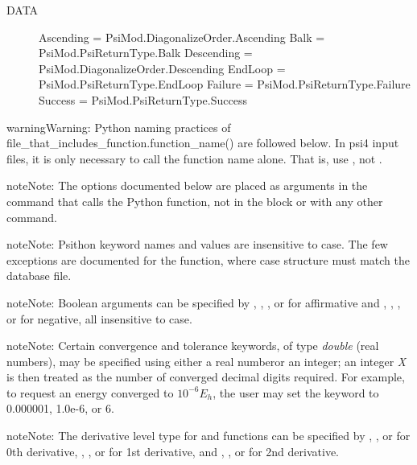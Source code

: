 \documentclass[letterpaper,10pt,english]{sphinxmanual}
\begin{document}
\begin{description}
\begin{description}
\begin{description}
\end{description}

\end{description}

\item[{DATA}] \leavevmode
Ascending = PsiMod.DiagonalizeOrder.Ascending
Balk = PsiMod.PsiReturnType.Balk
Descending = PsiMod.DiagonalizeOrder.Descending
EndLoop = PsiMod.PsiReturnType.EndLoop
Failure = PsiMod.PsiReturnType.Failure
Success = PsiMod.PsiReturnType.Success

\end{description}

\begin{notice}{warning}{Warning:}
Python naming practices of file\_that\_includes\_function.function\_name()
are followed below. In psi4 input files, it is only necessary to call the
function name alone. That is, use , not .
\end{notice}

\begin{notice}{note}{Note:}
The options documented below are placed as arguments in the command that
calls the Python function, not in the  block or with any
other  command.
\end{notice}

\begin{notice}{note}{Note:}
Psithon keyword names and values are insensitive to case. The few
exceptions are documented for the  function, where case
structure must match the database file.
\end{notice}
\label{notes:bool}\label{notes:boolean}
\begin{notice}{note}{Note:}
Boolean arguments can be specified by , , , or 
for affirmative and , , , or  for negative,
all insensitive to case.
\end{notice}
\label{notes:conv-double}
\begin{notice}{note}{Note:}
Certain convergence and tolerance keywords, of type \emph{double} (real numbers), may be specified using either a real numberor an integer; an integer \emph{X} is then treated as the number of converged decimal digits required. For example, to request an energy converged to $10^{-6} E_h$, the user may set the  keyword to 0.000001, 1.0e-6, or 6.
\end{notice}
\label{notes:dertype-string}
\begin{notice}{note}{Note:}
The derivative level type for {\hyperref[notes:driver.optimize]{}} and {\hyperref[notes:driver.frequency]{}}
functions can be specified by , , or  for 0th derivative,
, , or  for 1st derivative, and ,
, or  for 2nd derivative.
\end{notice}
\end{document}
